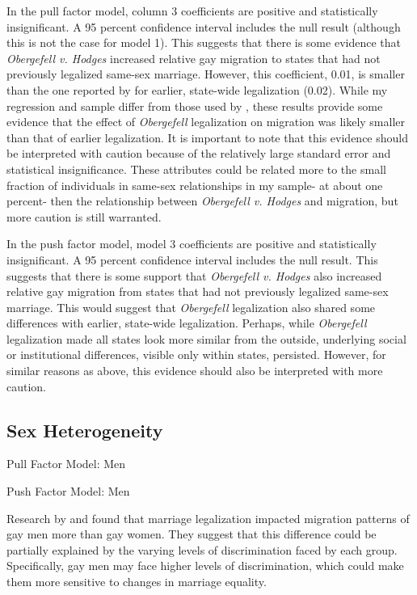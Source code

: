 \documentclass[12pt,letterpaper]{article}
\begin{document}
In the pull factor model, column 3 coefficients are positive and statistically insignificant. A 95 percent confidence interval includes the null result (although this is not the case for model 1). This suggests that there is some evidence that \textit{Obergefell v. Hodges} increased relative gay migration to states that had not previously legalized same-sex marriage. However, this coefficient, 0.01, is smaller than the one reported by \citet{1} for earlier, state-wide legalization (0.02). While my regression and sample differ from those used by \citet{1}, these results provide some evidence that the effect of \textit{Obergefell} legalization on migration was likely smaller than that of earlier legalization. It is important to note that this evidence should be interpreted with caution because of the relatively large standard error and statistical insignificance. These attributes could be related more to the small fraction of individuals in same-sex relationships in my sample- at about one percent- then the relationship between \textit{Obergefell v. Hodges} and migration, but more caution is still warranted.

In the push factor model, model 3 coefficients are positive and statistically insignificant. A 95 percent confidence interval includes the null result. This suggests that there is some support that \textit{Obergefell v. Hodges} also increased relative gay migration from states that had not previously legalized same-sex marriage. This would suggest that \textit{Obergefell} legalization also shared some differences with earlier, state-wide legalization. Perhaps, while \textit{Obergefell} legalization made all states look more similar from the outside, underlying social or institutional differences, visible only within states, persisted. However, for similar reasons as above, this evidence should also be interpreted with more caution.

\FloatBarrier
\subsection{Sex Heterogeneity}
\begin{table}[htbp]
    \centering
    \caption{Pull Factor Model: Men}
    \label{tab: male_expost_model}
    
\end{table}
\begin{table}[htbp]
    \centering
    \caption{Push Factor Model: Men}
    \label{tab: male_exante_model}
    
\end{table}
Research by \citet{1} and \cite{12} found that marriage legalization impacted migration patterns of gay men more than gay women. They suggest that this difference could be partially explained by the varying levels of discrimination faced by each group. Specifically, gay men may face higher levels of discrimination, which could make them more sensitive to changes in marriage equality.
\end{document}
